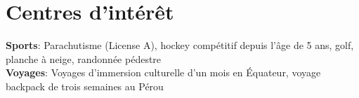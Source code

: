 \documentclass[letterpaper,11pt]{article}
\begin{document}
\section{Centres d'int\'er\^et}
  \begin{itemize}[leftmargin=0.15in, label={}]
    \small{\item{
    \textbf{Sports}{: Parachutisme (License A), hockey comp\'etitif depuis l'\^age de 5 ans, golf, planche \`a neige, randonn\'ee p\'edestre} \\
    \textbf{Voyages}{: Voyages d'immersion culturelle d'un mois en \'Equateur, voyage backpack de trois semaines au P\'erou} \\
    }}
  \end{itemize}
\end{document}
